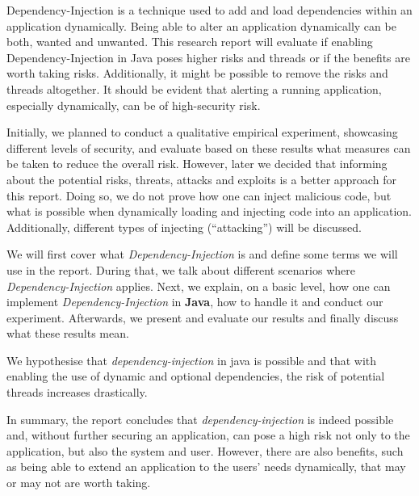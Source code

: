 \abstract
Dependency-Injection is a technique used to add and load dependencies within an application dynamically.
Being able to alter an application dynamically can be both, wanted and unwanted.
This research report will evaluate if enabling Dependency-Injection in Java poses higher risks and threads or if the benefits are worth taking risks.
Additionally, it might be possible to remove the risks and threads altogether.
It should be evident that alerting a running application, especially dynamically, can be of high-security risk.

Initially, we planned to conduct a qualitative empirical experiment, showcasing different levels of security, and evaluate based on these results what measures can be taken to reduce the overall risk.
However, later we decided that informing about the potential risks, threats, attacks and exploits is a better approach for this report.
Doing so, we do not prove how one can inject malicious code, but what is possible when dynamically loading and injecting code into an application.
Additionally, different types of injecting (``attacking'') will be discussed.

We will first cover what \textit{Dependency-Injection} is and define some terms we will use in the report.
During that, we talk about different scenarios where \textit{Dependency-Injection} applies.
Next, we explain, on a basic level, how one can implement \textit{Dependency-Injection} in \textbf{Java}, how to handle it and conduct our experiment.
Afterwards, we present and evaluate our results and finally discuss what these results mean.

We hypothesise that \textit{dependency-injection} in java is possible and that with enabling the use of dynamic and optional dependencies, the risk of potential threads increases drastically.

In summary, the report concludes that \textit{dependency-injection} is indeed possible and, without further securing an application, can pose a high risk not only to the application, but also the system and user.
However, there are also benefits, such as being able to extend an application to the users' needs dynamically, that may or may not are worth taking.

\clearpage